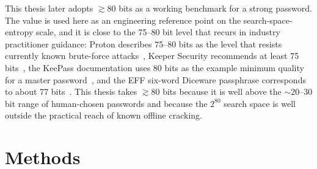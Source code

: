 \documentclass[11pt,titlepage,openany,oneside]{book}  %
\begin{document}
This thesis later adopts $\gtrsim 80$ bits as a working benchmark for a strong password. The value is used here as an engineering reference point on the search-space-entropy scale, and it is close to the 75--80 bit level that recurs in industry practitioner guidance: Proton describes 75--80 bits as the level that resists currently known brute-force attacks~\citep{proton2023entropy}, Keeper Security recommends at least 75 bits~\citep{keeper2024entropy}, the KeePass documentation uses 80 bits as the example minimum quality for a master password~\citep{keepassdocs}, and the EFF six-word Diceware passphrase corresponds to about 77 bits~\citep{eff2016diceware}. This thesis takes $\gtrsim 80$ bits because it is well above the $\sim 20$--$30$ bit range of human-chosen passwords and because the $2^{80}$ search space is well outside the practical reach of known offline cracking.


\chapter{Methods}
\label{cha:methods}
\end{document}
